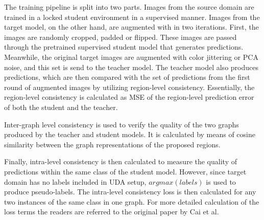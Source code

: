 \documentclass[english, 12pt, a4paper, elec, utf8, a-1b, online]{aaltothesis}
\begin{document}
The training pipeline is split into two parts. Images from the source domain are trained in a locked student environment in a supervised manner. Images from the target model, on the other hand, are augmented with in two iterations. First, the images are randomly cropped, padded or flipped. These images are passed through the pretrained supervised student model that generates predictions. Meanwhile, the original target images are augmented with color jittering or PCA noise, and this set is send to the teacher model. The teacher model also produces predictions, which are then compared with the set of predictions from the first round of augmented images by utilizing region-level consistency. Essentially, the region-level consistency is calculated as MSE of the region-level prediction error of both the student and the teacher. 

Inter-graph level consistency is used to verify the quality of the two graphs produced by the teacher and student models. It is calculated by means of cosine similarity between the graph representations of the proposed regions. 

Finally, intra-level consistency is then calculated to measure the quality of predictions within the same class of the student model. However, since target domain has no labels included in UDA setup, $argmax(labels)$ is used to produce pseudo-labels. The intra-level consistency loss is then calculated for any two instances of the same class in one graph. For more detailed calculation of the loss terms the readers are referred to the original paper by Cai et al. \cite{Cai2019}  
\end{document}
